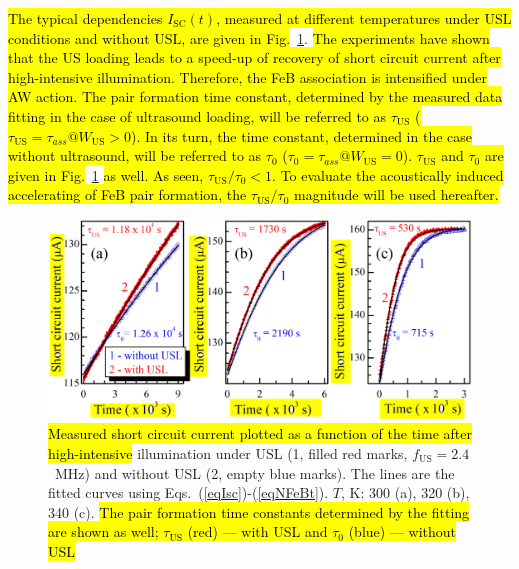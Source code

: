 \documentclass[sn-mathphys]{sn-jnl}%
\theoremstyle{thmstyleone}%
\theoremstyle{thmstyletwo}%
\theoremstyle{thmstylethree}%
\begin{document}
\hl{The typical dependencies $I_\mathrm{SC}(t)$, measured at different temperatures
under USL conditions and without USL, are given in Fig.}~\ref{figIscUs}.
\hl{The experiments have shown that the US loading leads to
a speed-up of recovery of short circuit current after high-intensive illumination.
Therefore, the  FeB association is intensified under AW action.
The pair formation time constant, determined by the measured data fitting
in the case of ultrasound loading, will be referred to
as $\tau_\mathrm{US}$ ($\tau_\mathrm{US}=\tau_{ass}@W_\mathrm{US}>0$).
In its turn, the time constant, determined in the case without ultrasound,
will be referred to as $\tau_0$ ($\tau_0=\tau_{ass}@W_\mathrm{US}=0$).
$\tau_\mathrm{US}$ and $\tau_0$ are given in Fig.}~\ref{figIscUs} \hl{ as well.
As seen, $\tau_\mathrm{US}/\tau_{0}< 1$.
To evaluate the acoustically induced accelerating of FeB pair formation,
the $\tau_\mathrm{US}/\tau_{0}$ magnitude will be used hereafter.}

\begin{figure}
\centering
 \includegraphics[width=1.0\textwidth]{Fig3}
\caption{
\hl{Measured short circuit current plotted as a function of the time after high-intensive} illumination
under USL (1, filled red marks, $f_\mathrm{US} = 2.4$~MHz) and without USL (2, empty blue marks).
The lines are the fitted curves using Eqs.~(\ref{eqIsc})-(\ref{eqNFeBt}).
$T$, K: 300 (a), 320 (b), 340 (c).
\hl{The pair formation time constants determined by the fitting are shown as well;
$\tau_\mathrm{US}$ (red) --- with USL and $\tau_{0}$ (blue) --- without USL}
}
\label{figIscUs}       %
\end{figure}
\end{document}
